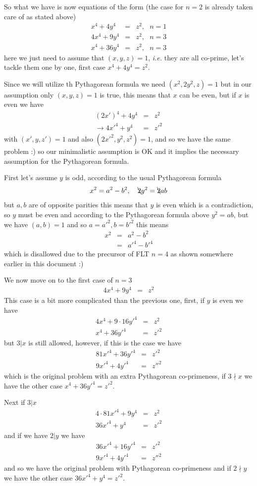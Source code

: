 \documentclass[aps,preprint,preprintnumbers,nofootinbib,showpacs,prd]{revtex4-1}
\newcommand{\ie}{{\it i.e.} }
\newcommand{\nbea}{\begin{eqnarray*}}
\newcommand{\neea}{\end{eqnarray*}}
\begin{document}
So what we have is now equations of the form (the case for $n=2$ is already taken care of as stated above)
%
\nbea
x^4 + 4y^4 & = & z^2, ~~~ n=1 \\
4x^4 + 9y^4 & = & z^2, ~~~ n=3 \\
x^4 + 36y^4 & = & z^2, ~~~ n=3
\neea
%
here we just need to assume that $(x,y,z)=1$, \ie they are all co-prime, let's tackle them one by one, first case $x^4 + 4y^4 = z^2$.

Since we will utilize th Pythagorean formula we need $(x^2,2y^2,z)=1$ but in our assumption only $(x,y,z)=1$ is true, this means that $x$ can be even, but if $x$ is even we have
%
\nbea
(2x')^4 + 4y^4 & = & z^2 \\
\to 4{x'}^4 + y^4 & = & {z'}^2
\neea
%
with $(x',y,z')=1$ and also $(2{x'}^2,y^2,z^2)=1$, and so we have the same problem :) so our minimalistic assumption is OK and it implies the necessary assumption for the Pythagorean formula.

First let's assume $y$ is odd, according to the usual Pythagorean formula
%
\nbea
x^2 = a^2 - b^2, ~~~\bcancel{2}y^2= \bcancel{2}ab
\neea
%
but $a,b$ are of opposite parities this means that $y$ is even which is a contradiction, so $y$ must be even and according to the Pythagorean formula above $y^2 = ab$, but we have $(a,b)=1$ and so $a = {a'}^2, b = {b'}^2$ this means
%
\nbea
x^2 & = & a^2 - b^2 \\
& = & {a'}^4 - {b'}^4
\neea
%
which is disallowed due to the precursor of FLT $n=4$ as shown somewhere earlier in this document :)

We now move on to the first case of $n=3$
%
\nbea
4x^4 + 9y^4 & = & z^2
\neea
%
This case is a bit more complicated than the previous one, first, if $y$ is even we have
%
\nbea
4x^4 + 9\cdot 16{y'}^4 & = & z^2 \\
x^4 + 36{y'}^4 & = & {z'}^2
\neea
%
but $3|x$ is still allowed, however, if this is the case we have 
%
\nbea
81 {x'}^4 + 36{y'}^4 & = & {z'}^2 \\
9 {x'}^4 + 4{y'}^4 & = & {z''}^2
\neea
%
which is the original problem with an extra Pythagorean co-primeness, if $3\nmid x$ we have the other case $x^4 + 36{y'}^4 = {z'}^2$.

Next if $3|x$
%
\nbea
4\cdot81 {x'}^4 + 9y^4 & = & z^2 \\
36{x'}^4 + y^4 & = & {z'}^2
\neea
%
and if we have $2|y$ we have
%
\nbea
36 {x'}^4 + 16{y'}^4 & = & {z'}^2 \\
9 {x'}^4 + 4{y'}^4 & = & {z''}^2
\neea
%
and so we have the original problem with Pythagorean co-primeness and if $2\nmid y$ we have the other case $36{x'}^4 + y^4 = {z'}^2$.
\end{document}
